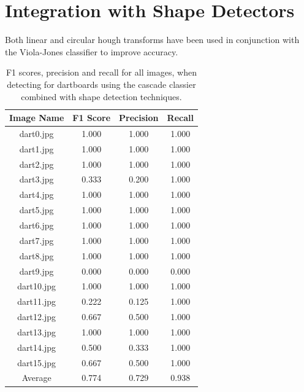 \documentclass[conference]{IEEEtran}
\begin{document}
\section{Integration with Shape Detectors}
Both linear and circular hough transforms have been used in conjunction with the Viola-Jones classifier to improve accuracy. 
\begin{table}[htp]
\caption{F1 scores, precision and recall for all images, when detecting for dartboards using the cascade classier combined with shape detection techniques. }
\begin{center}
\begin{tabular}{||c|c|c|c||}
\hline
Image Name			 	& F1 Score 	& Precision	& Recall            \\ \hline
dart0.jpg					& 1.000		&	1.000	& 1.000		\\
dart1.jpg					& 1.000		&	1.000	& 1.000		\\
dart2.jpg					& 1.000		&	1.000	& 1.000		\\
dart3.jpg					& 0.333		&	0.200	& 1.000		\\
dart4.jpg					& 1.000		&	1.000	& 1.000		\\
dart5.jpg					& 1.000		&	1.000	& 1.000		\\
dart6.jpg					& 1.000		&	1.000	& 1.000		\\
dart7.jpg					& 1.000		&	1.000	& 1.000		\\
dart8.jpg					& 1.000		&	1.000	& 1.000		\\
dart9.jpg					& 0.000		&	0.000	& 0.000		\\
dart10.jpg					& 1.000		&	1.000	& 1.000		\\
dart11.jpg					& 0.222		&	0.125	& 1.000		\\
dart12.jpg					& 0.667		&	0.500	& 1.000		\\
dart13.jpg					& 1.000		&	1.000	& 1.000		\\
dart14.jpg					& 0.500		&	0.333	& 1.000		\\
dart15.jpg					& 0.667		&	0.500	& 1.000		\\ \hline
Average 		 			& 0.774		&	0.729	& 0.938 		\\ \hline
\end{tabular}
\end{center}
\label{default}
\end{table}
\end{document}
